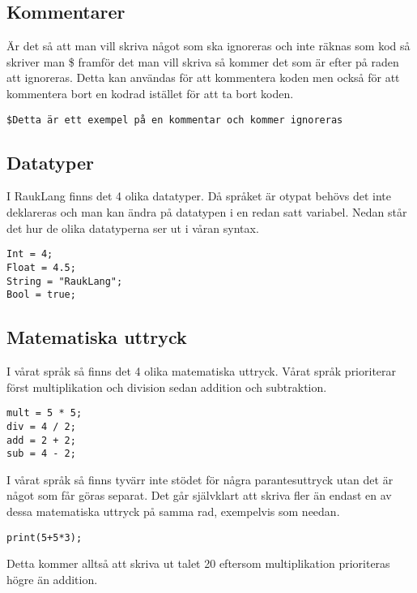 \documentclass[12pt]{TDP019}
\begin{document}
\subsection{Kommentarer}
Är det så att man vill skriva något som ska ignoreras och inte räknas som kod så skriver man \$ framför det man vill skriva så kommer det som är efter på raden att ignoreras. Detta kan användas för att kommentera koden men också för att kommentera bort en kodrad istället för att ta bort koden.

\begin{verbatim}
$Detta är ett exempel på en kommentar och kommer ignoreras
\end{verbatim}

\subsection{Datatyper}
I RaukLang finns det 4 olika datatyper. Då språket är otypat behövs det inte deklareras och man kan ändra på datatypen i en redan satt variabel. Nedan står det hur de olika datatyperna ser ut i våran syntax.

\begin{verbatim}
Int = 4;
Float = 4.5;
String = "RaukLang";
Bool = true;
\end{verbatim}

\subsection{Matematiska uttryck}
I vårat språk så finns det 4 olika matematiska uttryck. Vårat språk prioriterar först multiplikation och division sedan addition och subtraktion.

\begin{verbatim}
mult = 5 * 5;
div = 4 / 2;
add = 2 + 2;
sub = 4 - 2;
\end{verbatim}
I vårat språk så finns tyvärr inte stödet för några parantesuttryck utan det är något som får göras separat.
Det går självklart att skriva fler än endast en av dessa matematiska uttryck på samma rad, exempelvis som needan.
\begin{verbatim}
print(5+5*3);
\end{verbatim}
Detta kommer alltså att skriva ut talet 20 eftersom multiplikation prioriteras högre än addition.
\end{document}
